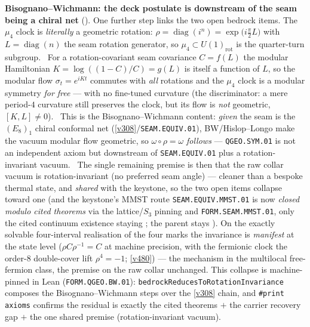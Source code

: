 \documentclass[11pt,a4paper]{article}
\begin{document}
\par\smallskip\noindent\textbf{Bisognano--Wichmann: the deck postulate is downstream of the seam being a chiral
net} (). One further step links the two open bedrock items. The $\mu_4$ clock
is \emph{literally} a geometric rotation: $\rho=\operatorname{diag}(i^n)=\exp\!\big(i\tfrac\pi2 L\big)$ with
$L=\operatorname{diag}(n)$ the seam rotation generator, so $\mu_4\subset U(1)_{\mathrm{rot}}$ is the quarter-turn
subgroup. \mE\ For a rotation-covariant seam covariance $C=f(L)$ the modular Hamiltonian $K=\log((1{-}C)/C)=g(L)$ is
itself a function of $L$, so the modular flow $\sigma_t=e^{iKt}$ commutes with \emph{all} rotations and the $\mu_4$
clock is a modular symmetry \emph{for free} --- with no fine-tuned curvature (the discriminator: a mere period-$4$
curvature still preserves the clock, but its flow is \emph{not} geometric, $[K,L]\neq0$). \mC\ This is the
Bisognano--Wichmann content: \emph{given} the seam is the $(E_8)_1$ chiral conformal net
(\vref{v308}/\texttt{SEAM.EQUIV.01}), BW/Hislop--Longo make the vacuum modular flow geometric, so
$\omega\circ\rho=\omega$ \emph{follows} --- \texttt{QGEO.SYM.01} is not an independent axiom but downstream of
\texttt{SEAM.EQUIV.01} plus a rotation-invariant vacuum. \mO\ The single remaining premise is then that the raw
collar vacuum is rotation-invariant (no preferred seam angle) --- cleaner than a bespoke thermal state, and
\emph{shared} with the keystone, so the two open items collapse toward one (and the keystone's MMST route
\texttt{SEAM.EQUIV.MMST.01} is now
\emph{closed modulo cited theorems} via the lattice/$S_3$ pinning and \texttt{FORM.SEAM.MMST.01}, only the cited
continuum existence staying \mO; the parent stays \mO). On the exactly solvable four-interval realisation of the four marks the
invariance is \emph{manifest} at the state level ($\rho C\rho^{-1}{=}C$ at machine precision, with the
fermionic clock the order-$8$ double-cover lift $\rho^4{=}{-}1$; \vref{v480}) --- the mechanism in the
multilocal free-fermion class, the premise on the raw collar unchanged. This collapse is machine-pinned in
Lean (\texttt{FORM.QGEO.BW.01}): \texttt{bedrockReducesToRotationInvariance} composes the Bisognano--Wichmann
steps over the \vref{v308} chain, and \texttt{\#print axioms} confirms the residual is exactly the cited theorems
$+$ the carrier recovery gap $+$ the one shared premise (rotation-invariant vacuum).
\end{document}
